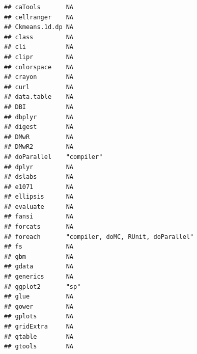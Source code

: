 \documentclass[]{article}
\begin{document}
\begin{verbatim}
## caTools       NA                                                        
## cellranger    NA                                                        
## Ckmeans.1d.dp NA                                                        
## class         NA                                                        
## cli           NA                                                        
## clipr         NA                                                        
## colorspace    NA                                                        
## crayon        NA                                                        
## curl          NA                                                        
## data.table    NA                                                        
## DBI           NA                                                        
## dbplyr        NA                                                        
## digest        NA                                                        
## DMwR          NA                                                        
## DMwR2         NA                                                        
## doParallel    "compiler"                                                
## dplyr         NA                                                        
## dslabs        NA                                                        
## e1071         NA                                                        
## ellipsis      NA                                                        
## evaluate      NA                                                        
## fansi         NA                                                        
## forcats       NA                                                        
## foreach       "compiler, doMC, RUnit, doParallel"                       
## fs            NA                                                        
## gbm           NA                                                        
## gdata         NA                                                        
## generics      NA                                                        
## ggplot2       "sp"                                                      
## glue          NA                                                        
## gower         NA                                                        
## gplots        NA                                                        
## gridExtra     NA                                                        
## gtable        NA                                                        
## gtools        NA                                                        

\end{verbatim}
\end{document}
